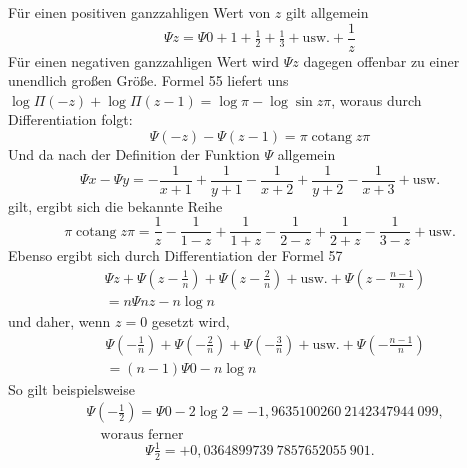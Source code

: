 Für einen positiven ganzzahligen Wert von $z$ gilt allgemein
\[
\Psi z=\Psi0+1+\tfrac12+\tfrac13+\text{usw.}+\frac1z\tag*{[67]}
\]
Für einen negativen ganzzahligen Wert wird $\Psi z$ dagegen offenbar zu einer unendlich großen Größe.
Formel 55 liefert uns $\log\Pi(-z)+\log\Pi(z-1)=\log\pi-\log\sin z\pi$, woraus durch Differentiation folgt:
\[
\Psi(-z)-\Psi(z-1)=\pi\operatorname{cotang}z\pi\tag*{[68]}
\]
Und da nach der Definition der Funktion $\Psi$ allgemein
\[
\Psi x-\Psi y=-\frac1{x+1}+\frac1{y+1}-\frac1{x+2}+\frac1{y+2}-\frac1{x+3}+\text{usw.}\tag*{[69]}
\]
gilt, ergibt sich die bekannte Reihe
\[
\pi\operatorname{cotang}z\pi=\frac1z-\frac1{1-z}+\frac1{1+z}-\frac1{2-z}+\frac1{2+z}-\frac1{3-z}+\text{usw.}
\]
Ebenso ergibt sich durch Differentiation der Formel 57
\[
\begin{aligned}
&\Psi z+\Psi\left(z-\frac1n\right)+\Psi\left(z-\frac2n\right)+\text{usw.}+\Psi\left(z-\frac{n-1}{n}\right)\\[4pt]
&=n\Psi nz-n\log n
\end{aligned}
\tag*{[70]}\]
und daher, wenn $z=0$ gesetzt wird,
\[
\begin{aligned}
&\Psi\left(-\frac1n\right)+\Psi\left(-\frac2n\right)+\Psi\left(-\frac3n\right)+\text{usw.}+\Psi\left(-\frac{n-1}{n}\right)\\[4pt]
&=(n-1)\Psi0-n\log n
\end{aligned}
\tag*{[71]}\]
So gilt beispielsweise
\[
\begin{aligned}
&\Psi\left(-\tfrac12\right)=\Psi0-2\log2=-1{,}9635100260\ 2142347944\ 099,\\[4pt]
&\quad\text{woraus ferner}
\end{aligned}
\]
\[
\Psi\tfrac12=+0{,}0364899739\ 7857652055\ 901.
\]
